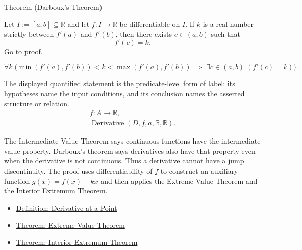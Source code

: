 
\begin{theorembox}{Theorem (Darboux's Theorem)}
\begin{theorem}
\label{thm:darboux}
Let $I := [a,b] \subseteq \mathbb{R}$ and let $f : I \to \mathbb{R}$ be differentiable on $I$. If $k$ is a real number strictly between $f'(a)$ and $f'(b)$, then there exists $c \in (a,b)$ such that
\[
f'(c) = k.
\]
\hyperref[prf:darboux]{Go to proof.}
\end{theorem}
\end{theorembox}

\begin{remark*}
\[
\forall k\;\bigl(\min(f'(a),f'(b)) < k < \max(f'(a),f'(b))
\;\Rightarrow\; \exists c \in (a,b)\;(f'(c)=k)\bigr).
\]
\end{remark*}

\begin{remark*}
The displayed quantified statement is the predicate-level form of label: its hypotheses name the input conditions, and its conclusion names the asserted structure or relation.
\[
\begin{aligned}
  f\colon A\to\mathbb{R},\\
  \operatorname{Derivative}(D,f,a,\mathbb{R},\mathbb{R}).
\end{aligned}
\]
\end{remark*}

\begin{remark*}[Interpretation]
The Intermediate Value Theorem says continuous functions have the intermediate
value property. Darboux's theorem says derivatives also have that property even
when the derivative is not continuous. Thus a derivative cannot have a jump
discontinuity. The proof uses differentiability of $f$ to construct an
auxiliary function $g(x)=f(x)-kx$ and then applies the Extreme Value Theorem
and the Interior Extremum Theorem.
\end{remark*}

\begin{dependencies}
\begin{itemize}
  \item \hyperref[def:derivative-at-a-point]{Definition: Derivative at a Point}
  \item \hyperref[thm:extreme-value-theorem]{Theorem: Extreme Value Theorem}
  \item \hyperref[thm:interior-extremum-theorem]{Theorem: Interior Extremum Theorem}
\end{itemize}
\end{dependencies}
